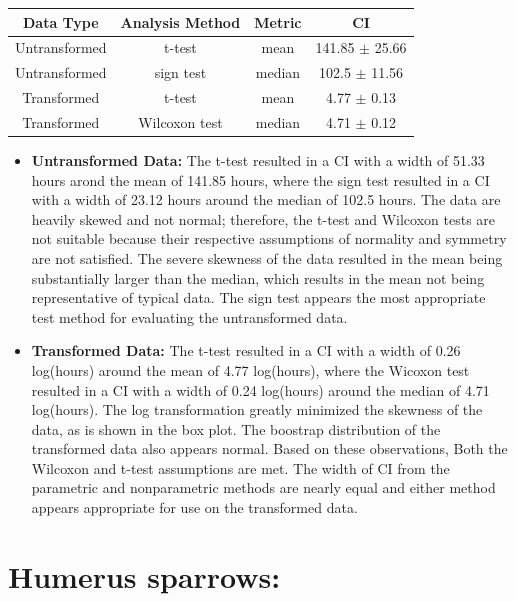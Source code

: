 \documentclass{article}\usepackage[]{graphicx}\usepackage[]{color}
\begin{document}
\vspace{.25in}
\begin{center}
\begin{tabular}{c c c c}
  Data Type & Analysis Method & Metric & CI \\ \hline
  Untransformed & t-test & mean & 141.85 $\pm$ 25.66 \\
  Untransformed & sign test & median & 102.5 $\pm$ 11.56 \\
  Transformed & t-test & mean & 4.77 $\pm$ 0.13 \\
  Transformed & Wilcoxon test & median & 4.71 $\pm$ 0.12 \\ \hline
\end{tabular}
\end{center}
\vspace{.1in}

\begin{itemize}

\item \textbf{Untransformed Data:}  The t-test resulted in a CI with a width of 51.33 hours
arond the mean of 141.85 hours, where the sign test resulted in a CI with a width of 23.12 hours
around the median of 102.5 hours.
The data are heavily skewed and not normal; therefore, the t-test and Wilcoxon tests are not
suitable because their respective assumptions of normality and symmetry are not satisfied.
The severe skewness of the data resulted in the mean being substantially larger than
the median, which results in the mean not being representative of typical data.
The sign test appears the most appropriate test method for evaluating the untransformed data.

\item \textbf{Transformed Data:}  The t-test resulted in a CI with a width of 0.26 log(hours)
around the mean of 4.77 log(hours), where the Wicoxon test resulted in a CI with a width of
0.24 log(hours) around the median of 4.71 log(hours).
The log transformation greatly minimized the skewness of the data, as is shown in the box
plot.  The boostrap distribution of the transformed data also appears normal.  Based on
these observations, Both the Wilcoxon and t-test assumptions are met.  The width of CI from
 the parametric and nonparametric methods are nearly equal and either method appears
  appropriate for use on the transformed data.

\end{itemize}

\section{Humerus sparrows:}
\end{document}
